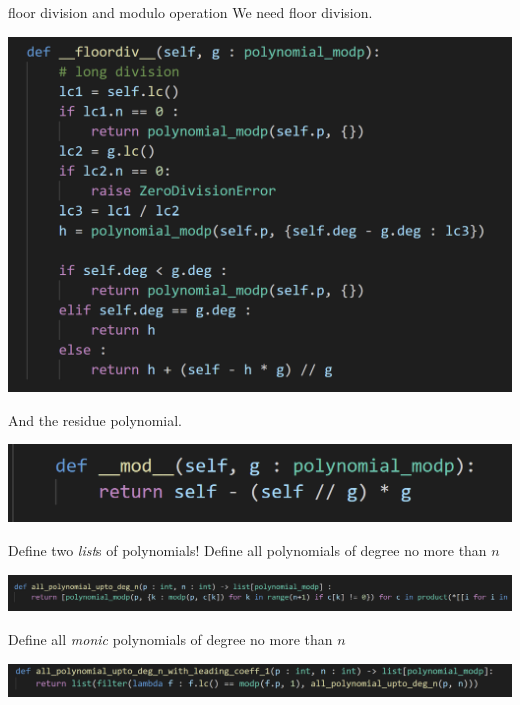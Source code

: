 \documentclass{beamer}
\begin{document}
\begin{frame}{floor division and modulo operation}
    We need floor division.
    \begin{center}
        \includegraphics[scale = .5]{floor.png}
    \end{center}
    And the residue polynomial.
    \begin{center}
        \includegraphics[scale = .5]{module.png}
    \end{center}
\end{frame}

\begin{frame}{Define two \emph{list}s of polynomials!}
    Define all polynomials of degree no more than $n$
    \begin{center}
        \includegraphics[scale = .5]{allpoly.png}
    \end{center}
    Define all \emph{monic} polynomials of degree no more than $n$
    \begin{center}
        \includegraphics[scale = .5]{allmonicpoly.png}
    \end{center}
\end{frame}
\end{document}
